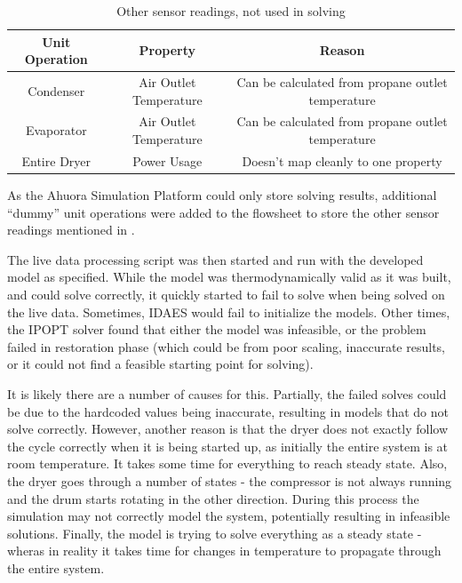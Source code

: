 \begin{table}[htbp]
    \centering
    \caption{Other sensor readings, not used in solving}
    \label{tab:liveprops}
    \begin{tabular}{|c|c|c|}
        \hline
            \textbf{Unit Operation} & \textbf{Property} & \textbf{Reason} \\
            \hline
            Condenser & Air Outlet Temperature & Can be calculated from propane outlet temperature \\
            Evaporator & Air Outlet Temperature & Can be calculated from propane outlet temperature \\
            Entire Dryer & Power Usage & Doesn't map cleanly to one property \\
        \hline
    \end{tabular}
\end{table}

As the Ahuora Simulation Platform could only store solving results, additional ``dummy'' unit operations were added to the flowsheet to store the other sensor readings mentioned in .

The live data processing script was then started and run with the developed model as specified.
While the model was thermodynamically valid as it was built, and could solve correctly, it quickly started to fail to solve when being solved on the live data. 
Sometimes, IDAES would fail to initialize the models. Other times, the IPOPT solver found that either the model was infeasible, or the problem failed in restoration phase (which could be from poor scaling, inaccurate results, or it could not find a feasible starting point for solving).

It is likely there are a number of causes for this. Partially, the failed solves could be due to the hardcoded values being inaccurate, resulting in models that do not solve correctly. However, another reason is that the dryer does not exactly follow the cycle correctly when it is being started up, as initially the entire system is at room temperature. It takes some time for everything to reach steady state. 
Also, the dryer goes through a number of states - the compressor is not always running and the drum starts rotating in the other direction. During this process the simulation may not correctly model the system, potentially resulting in infeasible solutions. 
Finally, the model is trying to solve everything as a steady state - wheras in reality it takes time for changes in temperature to propagate through the entire system. 


